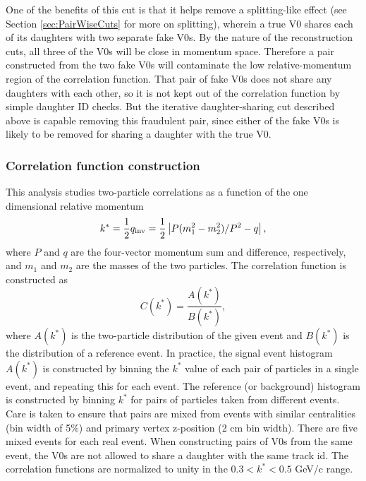 
One of the benefits of this cut is that it helps remove a splitting-like effect (see Section \ref{sec:PairWiseCuts} for more on splitting), wherein a true V0 shares each of its daughters with two separate fake V0s.  
By the nature of the reconstruction cuts, all three of the V0s will be close in momentum space.  
Therefore a pair constructed from the two fake V0s will contaminate the low relative-momentum region of the correlation function.  
That pair of fake V0s does not share any daughters with each other, so it is not kept out of the correlation function by simple daughter ID checks.  
But the iterative daughter-sharing cut described above is capable removing this fraudulent pair, since either of the fake V0s is likely to be removed for sharing a daughter with the true V0.


\subsubsection{Correlation function construction}
\label{sec:CFconstruct}

This analysis studies two-particle correlations as a function of the one dimensional relative momentum 
\begin{equation}
\label{eq:kstar}
k^*=\frac{1}{2}q_{\mathrm{inv}}=\frac{1}{2}\left\lvert P(m^2_1-m^2_2)/P^2 - q\right\rvert,
\end{equation}
where $P$ and $q$ are the four-vector momentum sum and difference, respectively, and $m_1$ and $m_2$ are the masses of the two particles.  
The correlation function is constructed as
\begin{equation}
\label{eq:CFDefinition}
C(k^*) = \frac{A(k^*)}{B(k^*)},
\end{equation}
where $A(k^*)$ is the two-particle distribution of the given event and $B(k^*)$ is the distribution of a reference event.  
In practice, the signal event histogram $A(k^*)$ is constructed by binning the $k^*$ value of each pair of particles in a single event, and repeating this for each event.  
The reference (or background) histogram is constructed by binning $k^*$ for pairs of particles taken from different events.  
Care is taken to ensure that pairs are mixed from events with similar centralities (bin width of 5\%) and primary vertex z-position (2 cm bin width).  
There are five mixed events for each real event.  
When constructing pairs of V0s from the same event, the V0s are not allowed to share a daughter with the same track id. 
The correlation functions are normalized to unity in the $ 0.3 < k^* < 0.5$ GeV/c range.

